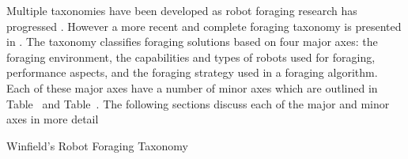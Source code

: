 Multiple taxonomies have been developed as robot foraging research has progressed \cite{oster1978caste,ostergaard2001emergent}. However a more recent and complete foraging taxonomy is presented in \cite{winfield2009foraging}. The taxonomy classifies foraging solutions based on four major axes: the foraging environment, the capabilities and types of robots used for foraging, performance aspects, and the foraging strategy used in a foraging algorithm. Each of these major axes have a number of minor axes which are outlined in Table~\cite{foragingtaxonomytable_part1} and Table~\cite{foragingtaxonomytable_part2}.  The following sections discuss each of the major and minor axes in more detail

\begin{table}
\centering
    \caption{Winfield's Robot Foraging Taxonomy \cite{winfield2009foraging}}
    \label{foragingtaxonomytable_part1}
    

\end{table}
